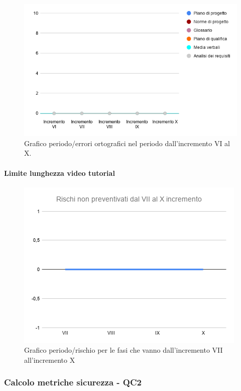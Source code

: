 \begin{figure}[H]
	\centering
	\includegraphics[width=0.8\linewidth]{./res/images/ortografia_3.png}
	\caption{Grafico periodo/errori ortografici nel periodo dall'incremento VI al X.}
	\label{fig:Grafico errori ortografici durante il periodo dall'incremento VI al X.}
\end{figure}

\paragraph{Limite lunghezza video tutorial}
\begin{figure}[H]
			\centering%
			\includegraphics[width=0.8\linewidth]{./res/images/RischiNonPreven_4.png}
			\caption{Grafico periodo/rischio per le fasi che vanno dall'incremento VII all'incremento X}
			\label{fig:Grafico periodo/rischio per le fasi che vanno dall'incremento VII all'incremento X}
	\end{figure}

\subsubsection{Calcolo metriche sicurezza - QC2}
